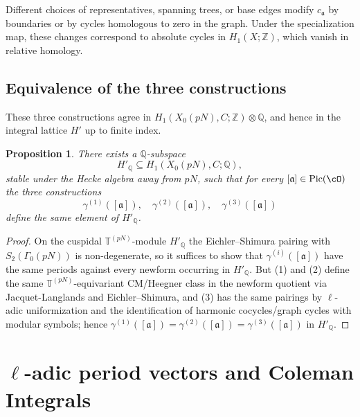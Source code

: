 \documentclass[10pt]{amsart}
\theoremstyle{theostyle}
\newtheorem{proposition}{Proposition}
\newcommand{\QQ}{\mathbb{Q}} \newcommand{\RR}{\mathbb{R}}
\newcommand{\ZZ}{\mathbb{Z}}
\renewcommand{\fa}{\mathfrak{a}} \newcommand{\fb}{\mathfrak{b}} \newcommand{\fc}{\mathfrak{c}}
\newcommand{\Pic}{\mathrm{Pic}}
\begin{document}
Different choices of representatives, spanning trees, or base edges modify
$c_{\fa}$ by boundaries or by cycles homologous to zero in the graph.
Under the specialization map, these changes correspond to absolute cycles in
$H_1(X;\ZZ)$, which vanish in relative homology.

\subsection{Equivalence of the three constructions}

These three constructions agree in
$H_1(X_0(pN),C;\ZZ)\otimes\QQ$, and hence %
in the integral lattice $H'$ up to finite index.

\begin{proposition}
	There exists a $\QQ$-subspace
	\[
	H'_\QQ \subseteq H_1(X_0(pN),C;\QQ),
	\]
	stable under the Hecke algebra away from $pN$, such that for every
	$[\fa]\in\Pic(\cO)$ the three constructions
	\[
	\gamma^{(1)}([\fa]),\quad
	\gamma^{(2)}([\fa]),\quad
	\gamma^{(3)}([\fa])
	\]
	define the same element of $H'_\QQ$.
\end{proposition}

\begin{proof}
On the cuspidal $\mathbb T^{(pN)}$-module $H'_{\QQ}$ the Eichler--Shimura
pairing with $S_2(\Gamma_0(pN))$ is non-degenerate, so it suffices to show that $\gamma^{(i)}([\fa])$ have the
same periods against every newform occurring in $H'_{\QQ}$.
	But (1) and (2) define the same $\mathbb T^{(pN)}$-equivariant CM/Heegner class in the newform quotient via Jacquet-Langlands and Eichler--Shimura, and (3) has the same pairings by $\ell$-adic uniformization and the identification of harmonic cocycles/graph cycles with modular symbols; hence $\gamma^{(1)}([\fa])=\gamma^{(2)}([\fa])=\gamma^{(3)}([\fa])$ in $H'_\QQ$.

\end{proof}




\section{$\ell$-adic period vectors and Coleman Integrals}
\label{sec:padic-vectors}
\end{document}
